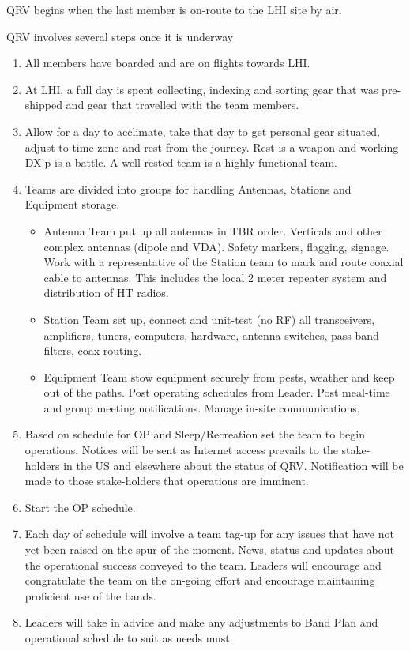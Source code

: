 \documentclass[11pt]{article}
\begin{document}
QRV begins when the last member is on-route to the LHI site by air.
\par
QRV involves several steps once it is underway
\begin{enumerate}
\item All members have boarded and are on flights towards LHI.
\item At LHI, a full day is spent collecting, indexing and sorting
gear that was pre-shipped and gear that travelled with the team members.
\item Allow for a day to acclimate, take that day to get personal gear
situated, adjust to time-zone and rest from the journey.  Rest is a weapon
and working DX'p is a battle. A well rested team is a highly functional team.
\item Teams are divided into groups for handling Antennas, Stations
and Equipment storage.
  \begin{itemize}
     \item Antenna Team put up all antennas in TBR order.  Verticals and
other complex antennas (dipole and VDA).  Safety markers, flagging, signage.
     Work with a representative of the Station team to mark and route coaxial
cable to antennas.  This includes the local 2 meter repeater system and 
distribution of HT radios.
     \item Station Team set up, connect and unit-test (no RF) all
transceivers, amplifiers, tuners, computers, hardware, antenna switches,
pass-band filters, coax routing.
     \item Equipment Team stow equipment securely from pests, weather
and keep out of the paths.  Post operating schedules from Leader.  Post
meal-time and group meeting notifications. Manage in-site communications,
\end{itemize}
\item Based on schedule for OP and Sleep/Recreation set the team to
begin operations.  Notices will be sent as Internet access prevails to
the stake-holders in the US and elsewhere about the status of QRV.  
Notification
will be made to those stake-holders that operations are imminent.
\item Start the OP schedule.
\item Each day of schedule will involve a team tag-up for any issues 
that have not yet been raised on the spur of the moment.  News,
status and updates about the operational success conveyed to the team.
Leaders will encourage and congratulate the team on the on-going effort
and encourage maintaining proficient use of the bands.
\item Leaders will take in advice and make any adjustments to Band Plan
and operational schedule to suit as needs must.
\end{enumerate}
\end{document}
